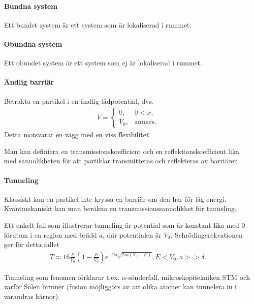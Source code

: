 \paragraph{Bundna system}
Ett bundet system är ett system som är lokaliserad i rummet.

\paragraph{Obundna system}
Ett obundet system är ett system som ej är lokaliserad i rummet.

\paragraph{Ändlig barriär}
Betrakta en partikel i en ändlig lådpotential, dvs.
\begin{align*}
	V = 
	\begin{cases}
		0,      &0 < x, \\
		V_{0},  &\text{annars.}
	\end{cases}
\end{align*}
Detta motsvarar en vägg med en viss \"flexibilitet\".

Man kan definiera en transmissionskoefficient och en reflektionskoefficient lika med sannolikheten för att partiklar transmitteras och reflekteras av barriären.

\paragraph{Tunneling}
Klassiskt kan en partikel inte kryssa en barriär om den har för låg energi. Kvantmekaniskt kan man beräkna en transmissionssannolikhet för tunneling.

Ett enkelt fall som illustrerar tunneling är potential som är konstant lika med $0$ förutom i en region med brädd $a$, där potentialen är $V_{0}$. Schrödingerekvationen ger för detta fallet
\begin{align*}
	T \approx 16\frac{E}{V_{0}}\left(1 - \frac{E}{V_{0}}\right)e^{-2a\sqrt{2m(V_{0} - E)}}, E < V_{0}, a >> \delta.
\end{align*}

Tunneling som fenomen förklarar t.ex. $\alpha$-sönderfall, mikroskopitekniken STM och varför Solen brinner (fusion möjliggörs av att olika atomer kan tunnelera in i varandras kärnor).